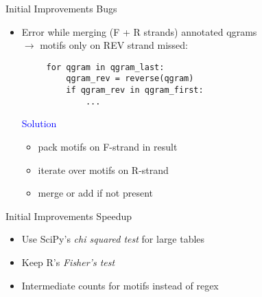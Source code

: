 \documentclass[nenglish]{beamer}
\begin{document}
\begin{frame}[fragile]{Initial Improvements}
{Bugs}
\begin{itemize}
  \itemsep0.5cm
 \item Error while merging (F + R strands) annotated qgrams \\$\rightarrow$ motifs only on REV strand missed:

\begin{lstlisting}                 
     for qgram in qgram_last:
         qgram_rev = reverse(qgram)
         if qgram_rev in qgram_first:
             ...

\end{lstlisting}
\textcolor{blue}{Solution}
\begin{itemize}
 \item pack motifs on F-strand in result
 \item iterate over motifs on R-strand 
 \item merge or add if not present
\end{itemize}
\end{itemize}
\end{frame}

\begin{frame}[fragile]{Initial Improvements}
{Speedup}
\begin{itemize}
  \itemsep0.5cm
  \item Use SciPy's \emph{chi squared test} for large tables
  \item Keep R's \emph{Fisher's test}
  \item Intermediate counts for motifs instead of regex
\end{itemize}
\end{frame}
\end{document}
